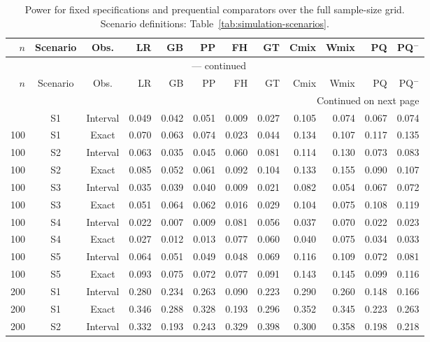 \documentclass[12pt]{article}
\theoremstyle{definition}
\theoremstyle{remark}
\begin{document}
\begingroup
\scriptsize
\setlength{\tabcolsep}{2.5pt}
\renewcommand{\arraystretch}{1.10}
\setlength{\LTcapwidth}{\textwidth}
\begin{longtable}{rccrrrrrrrrr}
\caption{Power for fixed specifications and prequential comparators over the full sample-size grid. Scenario definitions: Table~\ref{tab:simulation-scenarios}.}\label{tab:app-fixed-design-power}\\
\toprule
$n$ & Scenario & Obs. & LR & GB & PP & FH & GT & Cmix & Wmix & PQ & PQ$^{-}$ \\
\midrule
\endfirsthead
\multicolumn{12}{c}{\tablename\ \thetable{} --- continued}\\
\toprule
$n$ & Scenario & Obs. & LR & GB & PP & FH & GT & Cmix & Wmix & PQ & PQ$^{-}$ \\
\midrule
\endhead
\midrule
\multicolumn{12}{r}{Continued on next page}\\
\endfoot
\bottomrule
\endlastfoot
100 & S1 & Interval & 0.049 & 0.042 & 0.051 & 0.009 & 0.027 & 0.105 & 0.074 & 0.067 & 0.074 \\
100 & S1 & Exact & 0.070 & 0.063 & 0.074 & 0.023 & 0.044 & 0.134 & 0.107 & 0.117 & 0.135 \\
100 & S2 & Interval & 0.063 & 0.035 & 0.045 & 0.060 & 0.081 & 0.114 & 0.130 & 0.073 & 0.083 \\
100 & S2 & Exact & 0.085 & 0.052 & 0.061 & 0.092 & 0.104 & 0.133 & 0.155 & 0.090 & 0.107 \\
100 & S3 & Interval & 0.035 & 0.039 & 0.040 & 0.009 & 0.021 & 0.082 & 0.054 & 0.067 & 0.072 \\
100 & S3 & Exact & 0.051 & 0.064 & 0.062 & 0.016 & 0.029 & 0.104 & 0.075 & 0.108 & 0.119 \\
100 & S4 & Interval & 0.022 & 0.007 & 0.009 & 0.081 & 0.056 & 0.037 & 0.070 & 0.022 & 0.023 \\
100 & S4 & Exact & 0.027 & 0.012 & 0.013 & 0.077 & 0.060 & 0.040 & 0.075 & 0.034 & 0.033 \\
100 & S5 & Interval & 0.064 & 0.051 & 0.049 & 0.048 & 0.069 & 0.116 & 0.109 & 0.072 & 0.081 \\
100 & S5 & Exact & 0.093 & 0.075 & 0.072 & 0.077 & 0.091 & 0.143 & 0.145 & 0.099 & 0.116 \\
200 & S1 & Interval & 0.280 & 0.234 & 0.263 & 0.090 & 0.223 & 0.290 & 0.260 & 0.148 & 0.166 \\
200 & S1 & Exact & 0.346 & 0.288 & 0.328 & 0.193 & 0.296 & 0.352 & 0.345 & 0.223 & 0.263 \\
200 & S2 & Interval & 0.332 & 0.193 & 0.243 & 0.329 & 0.398 & 0.300 & 0.358 & 0.198 & 0.218 \\

\end{longtable}
\end{document}
